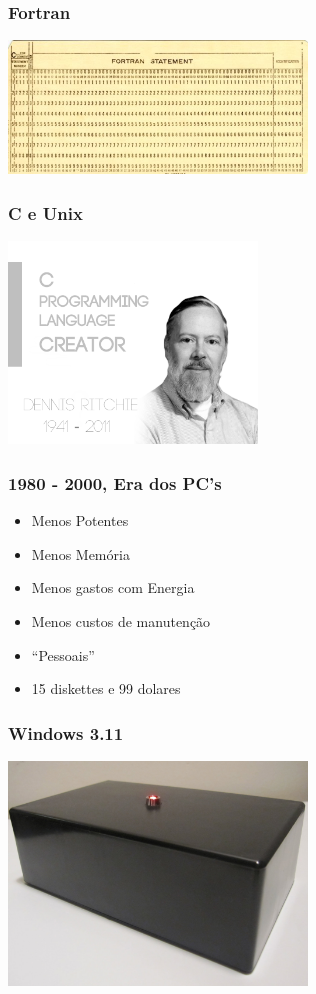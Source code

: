 \documentclass{beamer}
\begin{document}
\begin{frame} \frametitle{Fortran}
    \includegraphics[width=300px]{images/fortran}
\end{frame}

\begin{frame} \frametitle{C e Unix}
    \includegraphics[width=250px]{images/c-unix-creator}
\end{frame}

\begin{frame} \frametitle{ 1980 - 2000, Era dos PC's}
    \begin{itemize}
     \item Menos Potentes
     \item Menos Memória
     \item Menos gastos com Energia
     \item Menos custos de manutenção
     \item ``Pessoais''
     \item 15 diskettes e 99 dolares
    \end{itemize}
\end{frame}

\begin{frame} \frametitle{Windows 3.11}
\end{frame}

\begin{frame}
     \includegraphics[width=300px]{images/the-internet}
\end{frame}
\end{document}

